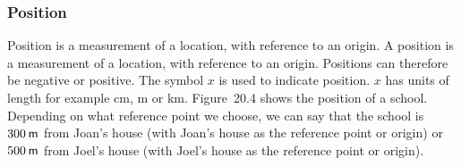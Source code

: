             \subsubsection{ Position}
            \nopagebreak
{} { Position is a measurement of a location, with reference to an origin.  } 
        \label{m38787*id62737}A position is a measurement of a location, with reference to an origin. Positions can therefore be negative or positive. The symbol $x$ is used to indicate position. $x$ has units of length for example cm, m or km.
Figure~20.4 shows the position of a school. Depending on what reference point we choose, we can say that the school is $300\phantom{\rule{2pt}{0ex}}\mathsf{m}$ from Joan's house (with Joan's house as the reference point or origin) or  $500\phantom{\rule{2pt}{0ex}}\mathsf{m}$ from Joel's house (with Joel's house as the reference point or origin).\par 
    \setcounter{subfigure}{0}

